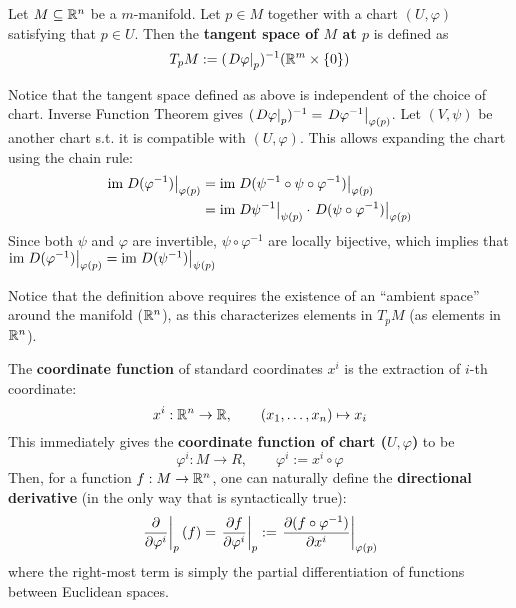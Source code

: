 \documentclass{article}
\begin{document}
\begin{definition}
    Let $M \subseteq \mathbb{R}^n$ be a $m$-manifold. Let $p \in M$ together with a chart $(U, \varphi)$ satisfying that $p \in U$. Then the \textbf{tangent space of $M$ at $p$} is defined as
    \[
        T_pM := (\left.D\varphi\right|_{p})^{-1}(\mathbb{R}^m \times \{0\})
    \]
\end{definition}

\begin{remark}
    Notice that the tangent space defined as above is independent of the choice of chart. Inverse Function Theorem gives $(\left.D\varphi\right|_{p})^{-1} = \left.D\varphi^{-1}\right|_{\varphi(p)}$. Let $(V, \psi)$ be another chart s.t. it is compatible with $(U, \varphi)$. This allows expanding the chart using the chain rule:
    \begin{align*}
        \mathrm{im} \left.D(\varphi^{-1})\right|_{\varphi(p)}
        & = \mathrm{im} \left.D(\psi^{-1} \circ \psi \circ \varphi^{-1})\right|_{\varphi(p)} \\
        & = \mathrm{im} \left.D\psi^{-1}\right|_{\psi(p)} \cdot \left.D(\psi \circ \varphi^{-1})\right|_{\varphi(p)}
    \end{align*}
    Since both $\psi$ and $\varphi$ are invertible, $\psi \circ \varphi^{-1}$ are locally bijective, which implies that $\mathrm{im} \left.D(\varphi^{-1})\right|_{\varphi(p)} = \mathrm{im} \left.D(\psi^{-1})\right|_{\psi(p)}$
\end{remark}

\begin{remark}
    Notice that the definition above requires the existence of an ``ambient space'' around the manifold ($\mathbb{R}^n$), as this characterizes elements in $T_pM$ (as elements in $\mathbb{R}^n$).
\end{remark}

\begin{definition}
    The \textbf{coordinate function} of standard coordinates $x^i$ is the extraction of $i$-th coordinate:
    \[
        x^i : \mathbb{R}^n \to \mathbb{R}, \qquad (x_1, \dots, x_n) \mapsto x_i
    \]
    This immediately gives the \textbf{coordinate function of chart ($U, \varphi$)} to be
    \[
        \varphi^i: M \to R, \qquad \varphi^i := x^i \circ \varphi
    \]
    Then, for a function $f: M \to \mathbb{R}^n$, one can naturally define the \textbf{directional derivative} (in the only way that is syntactically true):
    \[
        \left.\frac{\partial }{\partial \varphi^i}\right|_{p} (f) = \left.\frac{\partial f}{\partial \varphi^i}\right|_{p} := \left.\frac{\partial (f \circ \varphi^{-1})}{\partial x^i}\right|_{\varphi(p)}
    \]
    where the right-most term is simply the partial differentiation of functions between Euclidean spaces.
\end{definition}
\end{document}
